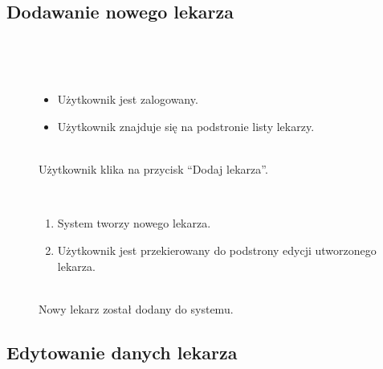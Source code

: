 \documentclass[11pt]{aghdpl}
\begin{document}
\subsection{Dodawanie nowego lekarza}

	\begin{description}
		\item[\useCaseAktor] \hfill \\
			\useCaseUzytkownik
		\item[\useCaseWarPocz] \hfill \\
			\begin{itemize}
				\item Użytkownik jest zalogowany.
				\item Użytkownik znajduje się na podstronie listy lekarzy.
			\end{itemize}
		\item[\useCaseZdarzInicj] \hfill \\
			Użytkownik klika na przycisk ``Dodaj lekarza''.
		\item[\useCaseScenBaz] \hfill \\ 
			\begin{enumerate}
				\item System tworzy nowego lekarza.
				\item Użytkownik jest przekierowany do podstrony edycji utworzonego lekarza.
			\end{enumerate}
		\item[\useCaseWarKonc] \hfill \\ 
			Nowy lekarz został dodany do systemu.
	\end{description}

\subsection{Edytowanie danych lekarza}
\end{document}
